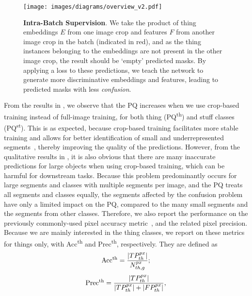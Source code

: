 \documentclass[10pt,twocolumn,letterpaper]{article}
\begin{document}
\begin{figure*}[t]
\centering
\texttt{[image: images/diagrams/overview\_v2.pdf]}
\caption{\textbf{Intra-Batch Supervision}. We take the product of thing embeddings $E$ from one image crop and features $F$ from another image crop in the batch (indicated in red), and as the thing instances belonging to the embeddings are not present in the other image crop, the result should be `empty' predicted masks. By applying a loss to these predictions, we teach the network to generate more discriminative embeddings and features, leading to predicted masks with less \textit{confusion}.}
\label{fig:overview}
\vspace{-5pt}
\end{figure*} 
From the results in , we observe that the PQ increases when we use crop-based training instead of full-image training, for both thing (PQ\textsuperscript{th}) and stuff classes (PQ\textsuperscript{st}). This is as expected, because crop-based training facilitates more stable training and allows for better identification of small and underrepresented segments~\cite{porzi2021allscales}, thereby improving the quality of the predictions. However, from the qualitative results in , it is also obvious that there are many inaccurate predictions for large objects when using crop-based training, which can be harmful for downstream tasks. Because this problem predominantly occurs for large segments and classes with multiple segments per image, and the PQ treats all segments and classes equally, the segments affected by the confusion problem have only a limited impact on the PQ, compared to the many small segments and the segments from other classes.
Therefore, we also report the performance on the previously commonly-used pixel accuracy metric~\cite{hurtado2022pa}, and the related pixel precision. Because we are mainly interested in the thing classes, we report on these metrics for things only, with Acc\textsuperscript{th} and Prec\textsuperscript{th}, respectively. They are defined as
\begin{equation}
\label{acc_metric}
    \textrm{Acc\textsuperscript{th}} = \frac{|TP^{px}_{th}|}{N^{px}_{th,g}};
\end{equation}
\begin{equation}
\label{prec_metric}
    \textrm{Prec\textsuperscript{th}} = \frac{|TP^{px}_{th}|}{|TP^{px}_{th}|+|FP^{px}_{th}|},
\end{equation}
\end{document}
